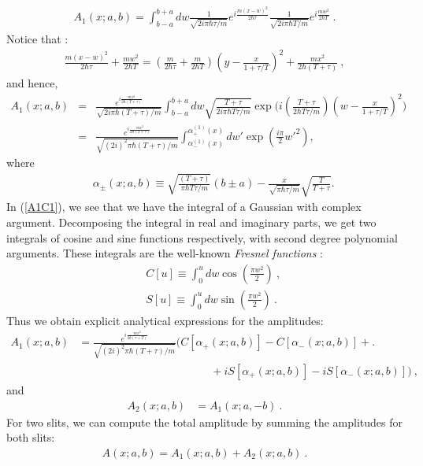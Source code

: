 \documentclass[12pt]{article}   %
\begin{document}
\begin{eqnarray}\label{A11}
A_1(x;a,b)=\int_{b-a}^{b+a} dw \frac{1}{\sqrt{2i\pi
\hbar\tau/m}}e^{i\frac{m (x-w)^2}{2\hbar\tau}}
\frac{1}{\sqrt{2i\pi \hbar T/m}}e^{i\frac{m w^2}{2\hbar T}}  \ .
\end{eqnarray}
Notice that :
\begin{eqnarray*}
\frac{m(x-w)^2}{2\hbar\tau}+\frac{mw^2}{2\hbar T}=
(\frac{m}{2\hbar\tau}+\frac{m}{2\hbar
T})(y-\frac{x}{1+\tau/T})^2 + \frac{mx^2}{2\hbar(T+\tau)}\ ,
\end{eqnarray*}
and hence,
\begin{eqnarray}\label{A1C1}
A_1(x;a,b)&=&\frac{e^{i\frac{mx^2}{2\hbar
(T+\tau)}}}{\sqrt{2i\pi \hbar (T+\tau)/m}}\int_{b-a}^{b+a} dw
\sqrt{\frac{T+\tau}{2i\pi \hbar
T\tau/m}}\exp{\bigl(i(\frac{T+\tau}{2\hbar
T\tau/m})(w-\frac{x}{1+\tau/T})^2\bigr)}
{}\nonumber\\{}&=&\frac{e^{i\frac{mx^2}{2\hbar
(T+\tau)}}}{\sqrt{(2i)^2\pi \hbar
(T+\tau)/m}}\int_{\alpha_{-}^{(1)}(x)}^{\alpha_{+}^{(1)}(x)} dw'
\exp{\left(\frac{i\pi}{2} w'^2\right)},
\end{eqnarray}
where
\begin{eqnarray}\label{alpha1}
&&\alpha_{\pm}(x;a,b)\equiv\sqrt{\frac{(T+\tau)}{\pi \hbar
T\tau/m}}(b\pm a)-\frac{x}{\sqrt{\pi
\hbar\tau/m}}\sqrt{\frac{T}{T+\tau}}.
\end{eqnarray}
In (\ref{A1C1}), we see that we have the integral of a Gaussian
with complex argument. Decomposing the integral in real and
imaginary parts, we get two integrals of cosine and sine functions
respectively, with second degree polynomial arguments. These
integrals are the well-known \textit{Fresnel functions}
\cite{Abramowitz}:
\begin{eqnarray*}
&& C[u]\equiv\int_0^u dw \cos{(\frac{\pi w^2}{2})}\ , {}\\{}&&
S[u]\equiv\int_0^u dw \sin{(\frac{\pi w^2}{2})}\ .
\end{eqnarray*}
Thus we obtain explicit analytical expressions for the amplitudes:
\begin{align}\label{A1C2}
 A_1(x;a,b)&=\frac{e^{i\frac{m x^2}{2\hbar
(\tau+T)}}}{\sqrt{(2i)^2\pi \hbar (T+\tau)/m}}\bigl(C[\alpha_{+}(x;a,b)] - C[\alpha_{-}(x;a,b)] +\bigr. \nonumber\\
& \qquad\qquad\qquad\qquad\qquad\qquad + iS[\alpha_{+}(x;a,b)] - iS[\alpha_{-}(x;a,b)] \bigr)\ ,
\end{align}
and
\begin{align}\label{A2C2}
A_2(x;a,b)&=A_1(x;a,-b)\ .
\end{align}
{For two slits, we can compute the total amplitude by summing the amplitudes for both slits:
\begin{eqnarray}\label{A}
A(x;a,b)=A_1(x;a,b)+A_2(x;a,b)\ .
\end{eqnarray}}
\end{document}
